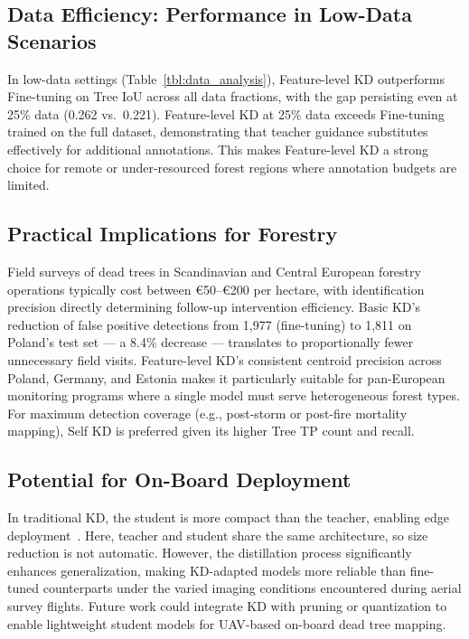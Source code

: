 \documentclass[twocolumn]{article}
\begin{document}
\subsection{Data Efficiency: Performance in Low-Data Scenarios}
In low-data settings (Table~\ref{tbl:data_analysis}), Feature-level KD outperforms Fine-tuning on Tree IoU across all data fractions, with the gap persisting even at 25\% data (0.262 vs.\ 0.221). Feature-level KD at 25\% data exceeds Fine-tuning trained on the full dataset, demonstrating that teacher guidance substitutes effectively for additional annotations. This makes Feature-level KD a strong choice for remote or under-resourced forest regions where annotation budgets are limited.

\subsection{Practical Implications for Forestry}
Field surveys of dead trees in Scandinavian and Central European forestry operations typically cost between €50--€200 per hectare, with identification precision directly determining follow-up intervention efficiency. Basic KD's reduction of false positive detections from 1,977 (fine-tuning) to 1,811 on Poland's test set — a 8.4\% decrease — translates to proportionally fewer unnecessary field visits. Feature-level KD's consistent centroid precision across Poland, Germany, and Estonia makes it particularly suitable for pan-European monitoring programs where a single model must serve heterogeneous forest types. For maximum detection coverage (e.g., post-storm or post-fire mortality mapping), Self KD is preferred given its higher Tree TP count and recall.

\subsection{Potential for On-Board Deployment}
In traditional KD, the student is more compact than the teacher, enabling edge deployment~\citep{himeur2024applications}. Here, teacher and student share the same architecture, so size reduction is not automatic. However, the distillation process significantly enhances generalization, making KD-adapted models more reliable than fine-tuned counterparts under the varied imaging conditions encountered during aerial survey flights. Future work could integrate KD with pruning or quantization to enable lightweight student models for UAV-based on-board dead tree mapping.
\end{document}
